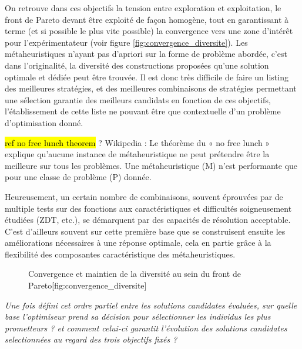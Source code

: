 On retrouve dans ces objectifs la tension entre exploration et exploitation, le front de Pareto devant être exploité de façon homogène, tout en garantissant à terme (et si possible le plus vite possible) la convergence vers une zone d'intérêt pour l'expérimentateur (voir figure \ref{fig:convergence_diversite}). Les métaheuristiques n'ayant pas d'apriori sur la forme de problème abordée, c'est dans l'originalité, la diversité des constructions proposées qu'une solution optimale et dédiée peut être trouvée. Il est donc très difficile de faire un listing des meilleures stratégies, et des meilleures combinaisons de stratégies permettant une sélection garantie des meilleurs candidats en fonction de ces objectifs, l'établissement de cette liste ne pouvant être que contextuelle d'un problème d'optimisation donné. 

\hl{ref no free lunch theorem }? Wikipedia : Le théorème du « no free lunch » explique qu’aucune instance de métaheuristique ne peut prétendre être la meilleure sur tous les problèmes. Une métaheuristique (M) n’est performante que pour une classe de problème (P) donnée.

Heureusement, un certain nombre de combinaisons, souvent éprouvées par de multiple tests sur des fonctions aux caractéristiques et difficultés soigneusement étudiées (ZDT, etc.), se démarquent par des capacités de résolution acceptable. C'est d'ailleurs souvent sur cette première base que se construisent ensuite les améliorations nécessaires à une réponse optimale, cela en partie grâce à la flexibilité des composantes caractéristique des métaheuristiques. 

\begin{figure}[!htbp]
  \begin{sidecaption}[fortoc]{Convergence et maintien de la diversité au sein du front de Pareto}[fig:convergence_diversite]
  \centering
  \qquad
 \end{sidecaption}
\end{figure}

\textit{Une fois défini cet ordre partiel entre les solutions candidates évaluées, sur quelle base l'optimiseur prend sa décision pour sélectionner les individus les plus prometteurs ? et comment celui-ci garantit l'évolution des solutions candidates selectionnées au regard des trois objectifs fixés ?}

